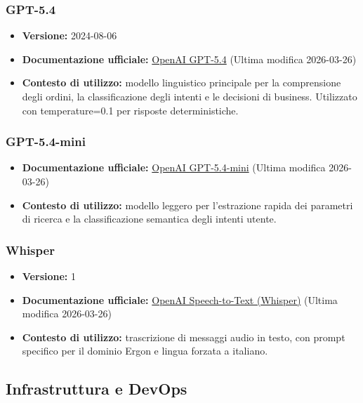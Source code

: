 \documentclass[a4paper, 11pt, oneside]{scrartcl}
\begin{document}
\subsubsection{GPT-5.4}
\begin{itemize}[noitemsep]
    \item \textbf{Versione:} 2024-08-06
    \item \textbf{Documentazione ufficiale:} \href{https://platform.openai.com/docs/models/gpt-5.4}{OpenAI GPT-5.4} (Ultima modifica 2026-03-26)
    \item \textbf{Contesto di utilizzo:} modello linguistico principale per la comprensione degli ordini, la classificazione degli intenti e le decisioni di business. Utilizzato con temperature=0.1 per risposte deterministiche.
\end{itemize}

\subsubsection{GPT-5.4-mini}
\begin{itemize}[noitemsep]
    \item \textbf{Documentazione ufficiale:} \href{https://platform.openai.com/docs/models/gpt-5.4-mini}{OpenAI GPT-5.4-mini} (Ultima modifica 2026-03-26)
    \item \textbf{Contesto di utilizzo:} modello leggero per l'estrazione rapida dei parametri di ricerca e la classificazione semantica degli intenti utente.
\end{itemize}

\subsubsection{Whisper}
\begin{itemize}[noitemsep]
    \item \textbf{Versione:} 1
    \item \textbf{Documentazione ufficiale:} \href{https://platform.openai.com/docs/guides/speech-to-text}{OpenAI Speech-to-Text (Whisper)} (Ultima modifica 2026-03-26)
    \item \textbf{Contesto di utilizzo:} trascrizione di messaggi audio in testo, con prompt specifico per il dominio Ergon e lingua forzata a italiano.
\end{itemize}

\subsection{Infrastruttura e DevOps}
\end{document}
